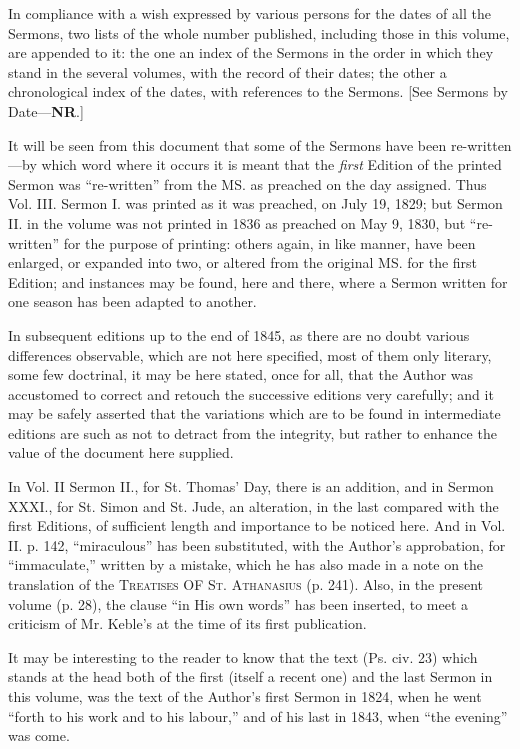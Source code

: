 In compliance with a wish expressed by various persons for the
dates of all the Sermons, two lists of the whole number published,
including those in this volume, are appended to it: the one an index
of the Sermons in the order in which they stand in the several
volumes, with the record of their dates; the other a chronological
index of the dates, with references to the Sermons. [See Sermons
by Date—\textbf{NR}.]


It will be seen from this document that some of the Sermons have
been re-written—by which word where it occurs it is meant that the \emph{first}
Edition of the printed Sermon was ``re-written'' from the MS.
as preached on the day assigned. Thus Vol. III. Sermon I. was printed
as it was preached, on July 19, 1829; but Sermon II. in the volume was
not printed in 1836 as preached on May 9, 1830, but
``re-written'' for the purpose of printing: others again, in
like manner, have been enlarged, or expanded into two, or altered from
the original MS. for the first Edition; and instances may be found,
here and there, where a Sermon written for one season has been adapted
to another.


In subsequent editions up to the end of 1845, as there are no doubt
various differences observable, which are not here specified, most of
them only literary, some few doctrinal, it may be here stated, once
for all, that the Author was accustomed to correct and retouch the
successive editions very carefully; and it may be safely asserted that
the variations which are to be found in intermediate editions are such
as not to detract from the integrity, but rather to enhance the value
of the document here supplied.


In Vol. II Sermon II., for St. Thomas' Day, there is an addition,
and in Sermon XXXI., for St. Simon and St. Jude, an alteration, in the
last compared with the first Editions, of sufficient length and
importance to be noticed here. And in Vol. II. p. 142,
``miraculous'' has been substituted, with the Author's
approbation, for ``immaculate,'' written by a mistake, which
he has also made in a note on the translation of the T\textsc{reatises}
OF S\textsc{t}. A\textsc{thanasius} (p. 241). Also, in the present volume (p. 28), the clause
``in His own words'' has been inserted, to meet a criticism of
Mr. Keble's at the time of its first publication.


It may be interesting to the reader to know that the text (Ps. civ.
23) which stands at the head both of the first (itself a recent one)
and the last Sermon in this volume, was the text of the Author's first
Sermon in 1824, when he went ``forth to his work and to his
labour,'' and of his last in 1843, when ``the evening''
was come.


